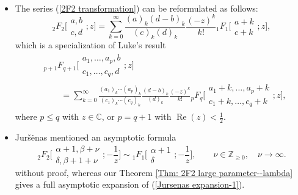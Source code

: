 \documentclass[pdftex]{sigma}
\numberwithin{equation}{section}
\newcommand{\CC}{\ensuremath{\mathbb{C}}}
\newcommand{\ZZ}{\ensuremath{\mathbb{Z}}}
\begin{document}
\begin{Remark}
	~
	\begin{itemize}\itemsep=0pt
		\item[(1)] The series (\ref{2F2 transformation}) can be reformulated as follows:
		\begin{equation}\label{2F2 transformation reformulated}
			{}_2F_2\biggl[\begin{matrix}
				a,b\\
				c,d
			\end{matrix};z\biggr]=\sum_{k=0}^{\infty}\frac{(a)_k(d-b)_k}{(c)_k(d)_k}\frac{(-z)^k}{k!}{}_1F_1\biggl[\begin{matrix}
				a+k\\
				c+k
			\end{matrix};z\biggr],
		\end{equation}
		which is a specialization of Luke's result \cite[Section~9.1, equation~(34)]{Luke-1969}
		\begin{align}
					&{}_{p+1}F_{q+1}\biggl[\begin{matrix}
						a_1,\dots,a_p,b\\
						c_1,\dots,c_q,d
					\end{matrix};z\biggr]{}\nonumber\\
 & \qquad{}= \sum_{k=0}^{\infty}\frac{ (a_1 )_k\cdots (a_p )_k}{ (c_1 )_k\cdots (c_q )_k}\frac{(d-b)_k}{(d)_k}
 \frac{(-z)^k}{k!}{}_{p}F_{q}\biggl[\begin{matrix}
						a_1+k,\dots,a_p+k\\
						c_1+k,\dots,c_q+k
					\end{matrix};z\biggr],\label{pFp transformation}
\end{align}
			where $p\leqslant q$ with $z\in\CC$, or $p=q+1$ with $\operatorname{Re}(z)<\frac{1}{2}$.
		
		\item[(2)] Jur\v{s}\.enas \cite[Section~4.1, p.~69]{Jursenas-2014} mentioned an asymptotic formula
		\begin{equation}\label{Jursenas expansion-1}
			{}_2F_2\biggl[\begin{matrix}
				\alpha+1,\beta+\nu\\
				\delta,\beta+1+\nu
			\end{matrix};-\frac{1}{z}\biggr]\sim {}_1F_1\biggl[\begin{matrix}
				\alpha+1\\
				\delta
			\end{matrix};-\frac{1}{z}\biggr],\qquad \nu\in\ZZ_{\geqslant 0},\quad\nu\to \infty.
		\end{equation}
		without proof, whereas our Theorem \ref{Thm: 2F2 large parameter--lambda} gives a full asymptotic expansion of (\ref{Jursenas expansion-1}).
	\end{itemize}
\end{Remark}
\end{document}
